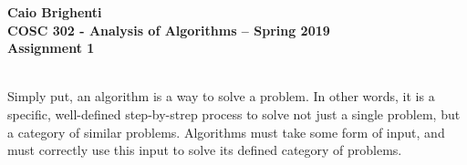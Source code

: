 \documentclass{article}
\begin{document}
\noindent \textbf{Caio Brighenti }\\
\noindent \textbf{COSC 302 - Analysis of Algorithms -- Spring 2019}\\%
\noindent \textbf{Assignment 1}\vspace{1em}\\
\begin{enumerate}
\end{enumerate}
	\item \\
	Simply put, an algorithm is a way to solve a problem. In other words, it is a specific, well-defined step-by-strep process to solve not just a single problem, but a category of similar problems. Algorithms must take some form of input, and must correctly use this input to solve its defined category of problems.
	\item \\
	
\end{document}
